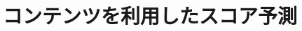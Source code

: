 \documentclass[platex,dvipdfmx,a4paper,twocolumn,base=10pt,jbase=10pt,ja=standard]{bxjsarticle}
\begin{document}







\section{コンテンツを利用したスコア予測}
\label{sec:scoreprediction}


\end{document}
